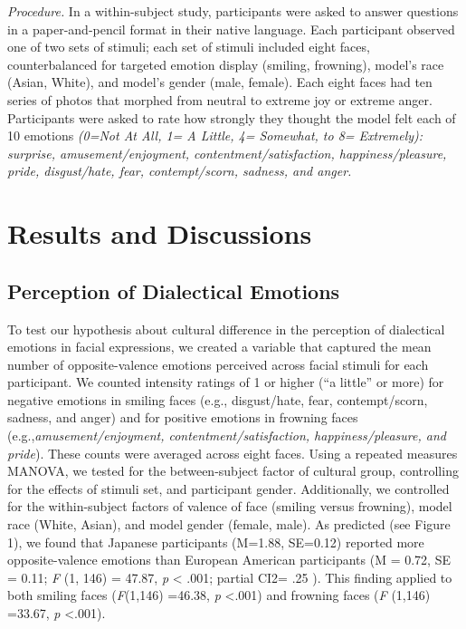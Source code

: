 \documentclass[english,man]{apa6}
\begin{document}
\emph{Procedure.} In a within-subject study, participants were asked to
answer questions in a paper-and-pencil format in their native language.
Each participant observed one of two sets of stimuli; each set of
stimuli included eight faces, counterbalanced for targeted emotion
display (smiling, frowning), model's race (Asian, White), and model's
gender (male, female). Each eight faces had ten series of photos that
morphed from neutral to extreme joy or extreme anger. Participants were
asked to rate how strongly they thought the model felt each of 10
emotions \emph{(0=Not At All, 1= A Little, 4= Somewhat, to 8=
Extremely): surprise, amusement/enjoyment, contentment/satisfaction,
happiness/pleasure, pride, disgust/hate, fear, contempt/scorn, sadness,
and anger.}

\section{Results and Discussions}\label{results-and-discussions}

\subsection{Perception of Dialectical
Emotions}\label{perception-of-dialectical-emotions}

To test our hypothesis about cultural difference in the perception of
dialectical emotions in facial expressions, we created a variable that
captured the mean number of opposite-valence emotions perceived across
facial stimuli for each participant. We counted intensity ratings of 1
or higher (\enquote{a little} or more) for negative emotions in smiling
faces (e.g., disgust/hate, fear, contempt/scorn, sadness, and anger) and
for positive emotions in frowning faces (e.g.,\emph{amusement/enjoyment,
contentment/satisfaction, happiness/pleasure, and pride}). These counts
were averaged across eight faces. Using a repeated measures MANOVA, we
tested for the between-subject factor of cultural group, controlling for
the effects of stimuli set, and participant gender. Additionally, we
controlled for the within-subject factors of valence of face (smiling
versus frowning), model race (White, Asian), and model gender (female,
male). As predicted (see Figure 1), we found that Japanese participants
(M=1.88, SE=0.12) reported more opposite-valence emotions than European
American participants (M = 0.72, SE = 0.11; \emph{F} (1, 146) = 47.87,
\emph{p} \textless{} .001; partial CI2= .25 ). This finding applied to
both smiling faces (\emph{F}(1,146) =46.38, \emph{p} \textless{}.001)
and frowning faces (\emph{F} (1,146) =33.67, \emph{p} \textless{}.001).
\end{document}

